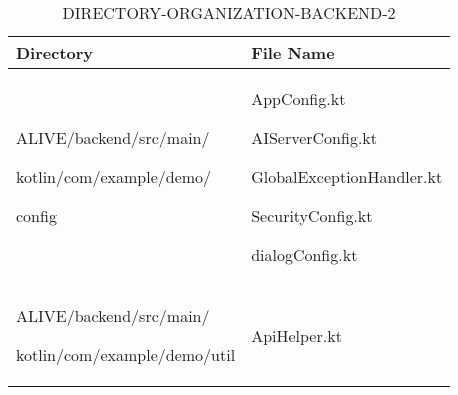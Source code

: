 \documentclass[conference]{IEEEtran}
\begin{document}
\clearpage

\begin{table}[h!]
\caption{DIRECTORY-ORGANIZATION-BACKEND-2}
\def\arraystretch{1.24} \small
    \begin{tabular}{|p{3.9cm}|p{4cm}|}
        \hline
        Directory & File Name \\ \hline
          
          ALIVE/backend/src/main/ \par kotlin/com/example/demo/ \par config & AppConfig.kt \par \par AIServerConfig.kt \par GlobalExceptionHandler.kt \par SecurityConfig.kt \par dialogConfig.kt\\ \hline

          ALIVE/backend/src/main/ \par kotlin/com/example/demo/util & ApiHelper.kt \\ \hline
\end{tabular}
\end{table}
\end{document}
